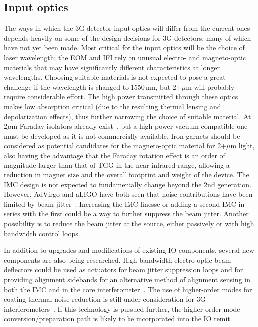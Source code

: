 \subsection{Input optics}
 The ways in which the 3G detector input optics will differ from the current ones depends heavily on some of the design decisions for 3G detectors, many of which have not yet been made. Most critical for the input optics will be the choice of laser wavelength; the EOM and IFI rely on unusual electro- and magneto-optic materials that may have significantly different characteristics at longer wavelengths. Choosing suitable materials is not expected to pose a great challenge if the wavelength is changed to 1550\,nm, but 2+$\mu$m will probably require considerable effort. The high power transmitted through these optics makes low absorption critical (due to the resulting thermal lensing and depolarization effects), thus further narrowing the choice of suitable material. At 2$\mu$m Faraday isolators already exist~\cite{EOTFI}, but a high power vacuum compatible one must be developed as it is not commercially available. Iron garnets should be considered as potential candidates for the magneto-optic material for 2+$\mu$m light, also having the advantage that the Faraday rotation effect is an order of magnitude larger than that of TGG in the near infrared range, allowing a reduction in magnet size and the overall footprint and weight of the device.
The IMC design is not expected to fundamentally change beyond the 2nd generation.  However, AdVirgo and aLIGO have both seen that noise contributions have been limited by beam jitter~\cite{aLIGOjitter,adVirgojitter}. Increasing the IMC finesse or adding a second IMC in series with the first could be a way to further suppress the beam jitter. Another possibility is to reduce the beam jitter at the source, either passively or with high bandwidth control loops.  

In addition to upgrades and modifications of existing IO components, several new components are also being researched. High bandwidth electro-optic beam deflectors could be used as actuators for beam jitter suppression loops and for providing alignment sidebands for an alternative method of alignment sensing in both the IMC and in the core interferometer~\cite{RFJASC}. The use of higher-order modes for coating thermal noise reduction is still under consideration for 3G interferometers~\cite{LGmodes}. If this technology is pursued further, the higher-order mode conversion/preparation path is likely to be incorporated into the IO remit. 

